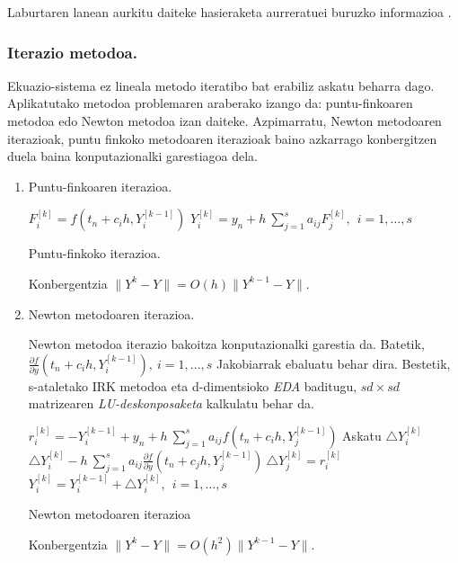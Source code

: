 Laburtaren lanean aurkitu daiteke hasieraketa aurreratuei buruzko informazioa \cite{Laburta1998}.  


\subsubsection*{Iterazio metodoa.}

Ekuazio-sistema ez lineala metodo iteratibo bat erabiliz askatu beharra dago. Aplikatutako metodoa problemaren araberako izango da: puntu-finkoaren metodoa edo Newton  metodoa izan daiteke. Azpimarratu, Newton metodoaren iterazioak, puntu finkoko metodoaren iterazioak baino azkarrago konbergitzen duela baina konputazionalki garestiagoa dela. 

\begin{enumerate}

\item Puntu-finkoaren iterazioa.

\begin{algorithm}[H]
  {
   $F_{i}^{[k]}=f(t_n+c_ih,Y_i^{[k-1]})$\;
   $Y_{i}^{[k]}=y_{n}+ h \ \sum\limits_{j=1}^{s} a_{ij} F_{j}^{[k]} , \ \  i=1,\dots,s$\; 
  }
 \caption{Puntu-finkoko iterazioa.}
 \label{alg:rkpf}
\end{algorithm}

Konbergentzia $\|Y^k-Y\|=O(h) \|Y^{k-1}-Y\|$.


\item Newton metodoaren iterazioa. 

Newton metodoa iterazio bakoitza konputazionalki garestia da. Batetik,  $\frac{\partial f}{\partial y}(t_n+c_ih,Y_i^{[k-1]}), \ i=1,\dots,s$ Jakobiarrak ebaluatu behar dira. Bestetik, s-ataletako IRK metodoa eta  d-dimentsioko \emph{EDA} baditugu, $sd \times sd$ matrizearen \emph{LU-deskonposaketa} kalkulatu behar da.    


\begin{algorithm}[H]
  {
   $r_{i}^{[k]}=-Y_i^{[k-1]}+y_n+h \ \sum\limits_{j=1}^{s} a_{ij} f(t_n+c_ih,Y_j^{[k-1]}) $\;
   Askatu $\triangle Y_i^{[k]}$\;
   $\triangle Y_i^{[k]}-h \ \sum\limits_{j=1}^{s} a_{ij} \frac{\partial f}{\partial y}(t_n+c_jh,Y_j^{[k-1]}) \ \triangle Y_j^{[k]}=r_i^{[k]}$\;
   $Y_i^{[k]}=Y_i^{[k-1]}+\triangle Y_i^{[k]}, \ \  i=1,\dots,s$\; 
  }
 \caption{Newton metodoaren iterazioa}
\end{algorithm}

Konbergentzia $\|Y^k-Y\|=O(h^2) \|Y^{k-1}-Y\|$.

\end{enumerate}

